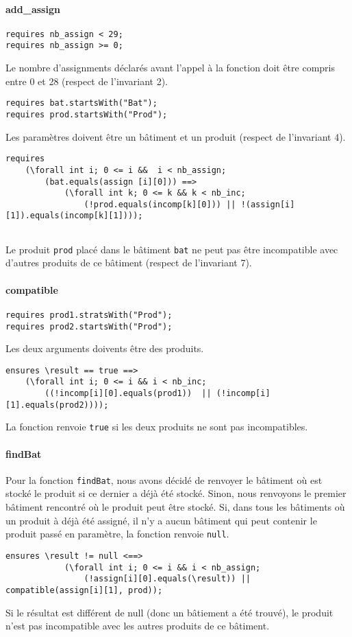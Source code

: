 \documentclass{report}[12pt]
\begin{document}
\paragraph{add\_assign}
\begin{lstlisting}
requires nb_assign < 29;
requires nb_assign >= 0;
\end{lstlisting}
Le nombre d'assignments déclarés avant l'appel à la fonction doit être compris entre 0 et 28 (respect de l'invariant 2).
\begin{lstlisting}
requires bat.startsWith("Bat");
requires prod.startsWith("Prod");
\end{lstlisting}
Les paramètres doivent être un bâtiment et un produit (respect de l'invariant 4).
\begin{lstlisting}
requires
    (\forall int i; 0 <= i &&  i < nb_assign; 
        (bat.equals(assign [i][0])) ==> 
			(\forall int k; 0 <= k && k < nb_inc;
            	(!prod.equals(incomp[k][0])) || !(assign[i][1]).equals(incomp[k][1])));
  
\end{lstlisting}
Le produit \verb-prod- placé dans le bâtiment \verb-bat- ne peut pas être incompatible avec d'autres produits de ce bâtiment (respect de l'invariant 7).

\paragraph{compatible}
\begin{lstlisting}
requires prod1.stratsWith("Prod");
requires prod2.startsWith("Prod");
\end{lstlisting}
Les deux arguments doivents être des produits.

\begin{lstlisting}
ensures \result == true ==> 
	(\forall int i; 0 <= i && i < nb_inc;
		((!incomp[i][0].equals(prod1))  || (!incomp[i][1].equals(prod2))));
\end{lstlisting}
La fonction renvoie \verb-true- si les deux produits ne sont pas incompatibles.

\paragraph{findBat}
Pour la fonction \verb-findBat-, nous avons décidé de renvoyer le bâtiment où est stocké le produit si ce dernier a déjà été stocké.
Sinon, nous renvoyons le premier bâtiment rencontré où le produit peut être stocké.
Si, dans tous les bâtiments où un produit à déjà été assigné, il n'y a aucun bâtiment qui peut contenir le produit passé en paramètre, la fonction renvoie \verb-null-.
\begin{lstlisting}
ensures \result != null <==>
			(\forall int i; 0 <= i && i < nb_assign;
				(!assign[i][0].equals(\result)) || compatible(assign[i][1], prod));
\end{lstlisting}
Si le résultat est différent de null (donc un bâtiement a été trouvé), le produit n'est pas incompatible avec les autres produits de ce bâtiment.
\end{document}
